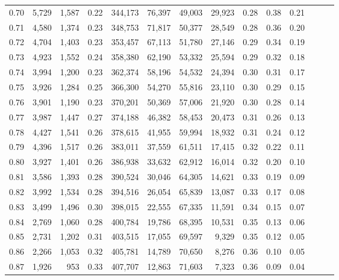 \begin{tabular}{rrrrrrrrrrrrrr}
0.70 &   5,729 &  1,587 &  0.22 &  344,173 &   76,397 &  49,003 &  29,923 &  0.28 &  0.38 &      0.21 \\
0.71 &   4,580 &  1,374 &  0.23 &  348,753 &   71,817 &  50,377 &  28,549 &  0.28 &  0.36 &      0.20 \\
0.72 &   4,704 &  1,403 &  0.23 &  353,457 &   67,113 &  51,780 &  27,146 &  0.29 &  0.34 &      0.19 \\
0.73 &   4,923 &  1,552 &  0.24 &  358,380 &   62,190 &  53,332 &  25,594 &  0.29 &  0.32 &      0.18 \\
0.74 &   3,994 &  1,200 &  0.23 &  362,374 &   58,196 &  54,532 &  24,394 &  0.30 &  0.31 &      0.17 \\
0.75 &   3,926 &  1,284 &  0.25 &  366,300 &   54,270 &  55,816 &  23,110 &  0.30 &  0.29 &      0.15 \\
0.76 &   3,901 &  1,190 &  0.23 &  370,201 &   50,369 &  57,006 &  21,920 &  0.30 &  0.28 &      0.14 \\
0.77 &   3,987 &  1,447 &  0.27 &  374,188 &   46,382 &  58,453 &  20,473 &  0.31 &  0.26 &      0.13 \\
0.78 &   4,427 &  1,541 &  0.26 &  378,615 &   41,955 &  59,994 &  18,932 &  0.31 &  0.24 &      0.12 \\
0.79 &   4,396 &  1,517 &  0.26 &  383,011 &   37,559 &  61,511 &  17,415 &  0.32 &  0.22 &      0.11 \\
0.80 &   3,927 &  1,401 &  0.26 &  386,938 &   33,632 &  62,912 &  16,014 &  0.32 &  0.20 &      0.10 \\
0.81 &   3,586 &  1,393 &  0.28 &  390,524 &   30,046 &  64,305 &  14,621 &  0.33 &  0.19 &      0.09 \\
0.82 &   3,992 &  1,534 &  0.28 &  394,516 &   26,054 &  65,839 &  13,087 &  0.33 &  0.17 &      0.08 \\
0.83 &   3,499 &  1,496 &  0.30 &  398,015 &   22,555 &  67,335 &  11,591 &  0.34 &  0.15 &      0.07 \\
0.84 &   2,769 &  1,060 &  0.28 &  400,784 &   19,786 &  68,395 &  10,531 &  0.35 &  0.13 &      0.06 \\
0.85 &   2,731 &  1,202 &  0.31 &  403,515 &   17,055 &  69,597 &   9,329 &  0.35 &  0.12 &      0.05 \\
0.86 &   2,266 &  1,053 &  0.32 &  405,781 &   14,789 &  70,650 &   8,276 &  0.36 &  0.10 &      0.05 \\
0.87 &   1,926 &    953 &  0.33 &  407,707 &   12,863 &  71,603 &   7,323 &  0.36 &  0.09 &      0.04 \\

\end{tabular}
